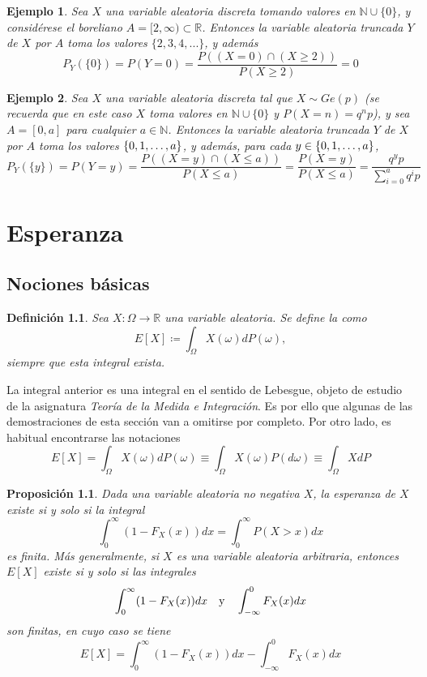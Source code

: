 \documentclass[11pt]{report}
\theoremstyle{mytheorem}
\newtheorem{proposition}{Proposición}
\theoremstyle{mydefinition}
\newtheorem{definition}{Definición}
\theoremstyle{myexample}
\newtheorem*{example}{Ejemplo}
\newenvironment{cdefinition} %
  {\begin{mdframed}[
        linewidth=3pt,
        linecolor=c1,
        bottomline=false,
        topline=false,
        rightline=false,
        innerrightmargin=0pt,
        innertopmargin=0pt,
        innerbottommargin=0pt,
        innerleftmargin=1em,
        skipabove=\baselineskip]
    \begin{definition}}
  {\end{definition}\end{mdframed}}
\newenvironment{cproposition} %
  {\begin{mdframed}[
        linewidth=3pt,
        linecolor=c2,
        bottomline=false,
        topline=false,
        rightline=false,
        innerrightmargin=0pt,
        innertopmargin=0pt,
        innerbottommargin=0pt,
        innerleftmargin=1em,
        skipabove=\baselineskip]
    \begin{proposition}}
  {\end{proposition}\end{mdframed}}
\newcommand{\R}{\mathbb R}
\newcommand{\N}{\mathbb N}
\newcommand{\mybf}[1]{\boldmath\textbf{\color{c1}#1}\unboldmath} %
\begin{document}
\begin{example}
Sea $X$ una variable aleatoria discreta tomando valores en $\N \cup \{0\}$, y considérese el boreliano $A = [2,\infty) \subset \R$. Entonces la variable aleatoria truncada $Y$ de $X$ por $A$ toma los valores $\{2,3,4,...\}$, y además
\[P_Y(\{0\}) = P(Y=  0)=\frac{P((X = 0) \cap (X \geq 2))}{P(X \geq 2)} = 0\]
\end{example}

\begin{example}
Sea $X$ una variable aleatoria discreta tal que $X \sim Ge(p)$ (se recuerda que en este caso $X$ toma valores en $\N \cup \{0\}$ y $P(X=n) =q^np$), y sea $A = [0,a]$ para cualquier $a \in \N$. Entonces la variable aleatoria truncada $Y$ de $X$ por $A$ toma los valores $\{0,1,\mathellipsis,a\}$, y además, para cada $y \in \{0,1,\mathellipsis,a\}$,
\[P_Y(\{y\}) = P(Y = y) = \frac{P((X = y) \cap (X \leq a))}{P(X \leq a)} = \frac{P(X = y)}{P(X \leq a)} = \frac{q^yp}{\sum_{i=0}^aq^ip}\]
\end{example}

\chapter{Esperanza}

\section{Nociones básicas}

\begin{cdefinition}
Sea $X \colon \Omega \to \R$ una variable aleatoria. Se define la \mybf{{esperanza de $\bm{X}$}} como
\[E[X] \coloneqq \int_{\Omega} X(\omega)dP(\omega),\]
siempre que esta integral exista.
\end{cdefinition}

La integral anterior es una integral en el sentido de Lebesgue, objeto de estudio de la asignatura \textit{Teoría de la Medida e Integración}. Es por ello que algunas de las demostraciones de esta sección van a omitirse por completo. Por otro lado, es habitual encontrarse las notaciones
\[E[X]  =\int_{\Omega}X(\omega)dP(\omega) \equiv \int_{\Omega} X(\omega)P(d\omega) \equiv\int_{\Omega}XdP\]

\begin{cproposition}
Dada una variable aleatoria no negativa $X$, la esperanza de $X$ existe si y solo si la integral
\[\int_0^{\infty} (1-F_X(x))dx = \int_0^{\infty}P(X > x) dx\]
es finita. Más generalmente, si $X$ es una variable aleatoria arbitraria, entonces $E[X]$ existe si y solo si las integrales
\[\int_0^{\infty}(1-F_X(x))dx \quad \textup{y} \quad \int_{-\infty}^0 F_X(x)dx\]
son finitas, en cuyo caso se tiene
\[E[X] = \int_0^{\infty}(1-F_X(x))dx-\int_{-\infty}^0 F_X(x)dx\]
\end{cproposition}
\end{document}
